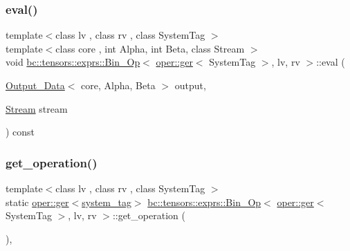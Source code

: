 \subsubsection{\texorpdfstring{eval()}{eval()}}
{\footnotesize\ttfamily template$<$class lv , class rv , class System\+Tag $>$ \\
template$<$class core , int Alpha, int Beta, class Stream $>$ \\
void \hyperlink{structbc_1_1tensors_1_1exprs_1_1Bin__Op}{bc\+::tensors\+::exprs\+::\+Bin\+\_\+\+Op}$<$ \hyperlink{structbc_1_1oper_1_1ger}{oper\+::ger}$<$ System\+Tag $>$, lv, rv $>$\+::eval (\begin{DoxyParamCaption}\item[{\hyperlink{structbc_1_1tensors_1_1exprs_1_1Output__Data}{Output\+\_\+\+Data}$<$ core, Alpha, Beta $>$}]{output,  }\item[{\hyperlink{classbc_1_1streams_1_1Stream}{Stream}}]{stream }\end{DoxyParamCaption}) const\hspace{0.3cm}{\ttfamily [inline]}}

\mbox{\label{structbc_1_1tensors_1_1exprs_1_1Bin__Op_3_01oper_1_1ger_3_01SystemTag_01_4_00_01lv_00_01rv_01_4_a662c70bc8aec8c6ccfde818e119970f9}} 
\subsubsection{\texorpdfstring{get\+\_\+operation()}{get\_operation()}}
{\footnotesize\ttfamily template$<$class lv , class rv , class System\+Tag $>$ \\
static \hyperlink{structbc_1_1oper_1_1ger}{oper\+::ger}$<$\hyperlink{structbc_1_1tensors_1_1exprs_1_1Bin__Op_3_01oper_1_1ger_3_01SystemTag_01_4_00_01lv_00_01rv_01_4_abcd305e8f31931d98bc3cbd42833b73d}{system\+\_\+tag}$>$ \hyperlink{structbc_1_1tensors_1_1exprs_1_1Bin__Op}{bc\+::tensors\+::exprs\+::\+Bin\+\_\+\+Op}$<$ \hyperlink{structbc_1_1oper_1_1ger}{oper\+::ger}$<$ System\+Tag $>$, lv, rv $>$\+::get\+\_\+operation (\begin{DoxyParamCaption}{ }\end{DoxyParamCaption})\hspace{0.3cm}{\ttfamily [inline]}, {\ttfamily [static]}}

